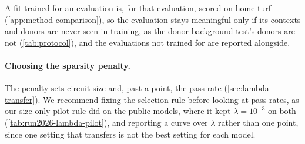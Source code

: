 A fit trained for an evaluation is, for that evaluation, scored on home turf (\cref{app:method-comparison}), so the evaluation stays meaningful only if its contexts and donors are never seen in training, as the donor-background test's donors are not (\cref{tab:protocol}), and the evaluations not trained for are reported alongside.

\paragraph{Choosing the sparsity penalty.}
The penalty sets circuit size and, past a point, the pass rate (\cref{sec:lambda-transfer}).
We recommend fixing the selection rule before looking at pass rates, as our size-only pilot rule did on the public models, where it kept $\lambda = 10^{-3}$ on both (\cref{tab:run2026-lambda-pilot}), and reporting a curve over $\lambda$ rather than one point, since one setting that transfers is not the best setting for each model.

